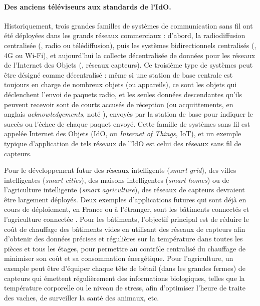 \begin{resume_fr}
\paragraph{Des anciens téléviseurs aux standards de l'IdO.}
%
Historiquement, trois grandes familles de systèmes de communication sans fil ont été déployées dans les grands réseaux commerciaux : d'abord, la radiodiffusion centralisée (\eg, radio ou télédiffusion), puis les systèmes bidirectionnels centralisés (\eg, 4G ou Wi-Fi), et aujourd'hui la collecte décentralisée de données pour les réseaux de l'Internet des Objets (\eg, réseaux capteurs).
%
Ce troisième type de systèmes peut être désigné comme décentralisé :
même si une station de base centrale est toujours en charge de nombreux objets (ou appareils),
ce sont les objets qui déclenchent l'envoi de paquets radio, et les seules données descendantes qu'ils peuvent recevoir sont de courts accusés de réception (ou acquittements, en anglais \emph{acknowledgements}, noté \Ack), envoyés par la station de base pour indiquer le succès ou l'échec de chaque paquet envoyé.
Cette famille de systèmes sans fil est appelée Internet des Objets (IdO, ou \emph{Internet of Things}, IoT),
et un exemple typique d'application de tels réseaux de l'IdO est celui des réseaux sans fil de capteurs.

Pour le développement futur des \guillemotleft{} réseaux intelligents \guillemotright{} (\emph{smart grid}), des \guillemotleft{} villes intelligentes \guillemotright{} (\emph{smart cities}), des \guillemotleft{} maisons intelligentes \guillemotright{} (\emph{smart homes}) ou de \guillemotleft{} l'agriculture intelligente \guillemotright{} (\emph{smart agriculture}), des réseaux de capteurs devraient être largement déployés.
Deux exemples d'applications futures qui sont déjà en cours de déploiement, en France ou à l'étranger, sont les \guillemotleft{} bâtiments connectés \guillemotright{} et \guillemotleft{} l'agriculture connectée \guillemotright{}.
Pour les bâtiments, l'objectif principal est de réduire le coût de chauffage des bâtiments vides en utilisant des réseaux de capteurs afin d'obtenir des données précises et régulières sur la température dans toutes les pièces et tous les étages, pour permettre au contrôle centralisé du chauffage de minimiser son coût et sa consommation énergétique.
Pour l'agriculture, un exemple peut être d'équiper chaque tête de bétail (dans les grandes fermes) de capteurs qui émettent régulièrement des informations biologiques, telles que la température corporelle ou le niveau de stress, afin d'optimiser l'heure de traite des vaches, de surveiller la santé des animaux, etc.



\end{resume_fr}
